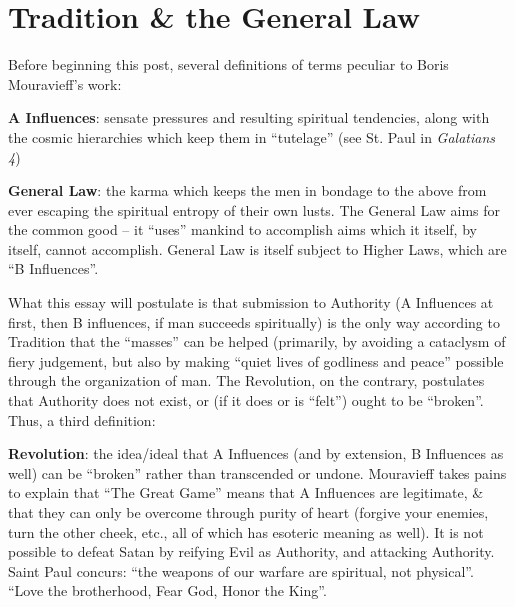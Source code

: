 \section{Tradition \& the General Law}

Before beginning this post, several definitions of terms peculiar to Boris Mouravieff's work:

\textbf{A Influences}: sensate pressures and resulting spiritual tendencies, along with the cosmic hierarchies which keep them in ``tutelage'' (see St. Paul in \emph{Galatians 4})

\textbf{General Law}: the karma which keeps the men in bondage to the above from ever escaping the spiritual entropy of their own lusts. The General Law aims for the common good -- it ``uses'' mankind to accomplish aims which it itself, by itself, cannot accomplish. General Law is itself subject to Higher Laws, which are ``B Influences''.

What this essay will postulate is that submission to Authority (A Influences at first, then B influences, if man succeeds spiritually) is the only way according to Tradition that the ``masses'' can be helped (primarily, by avoiding a cataclysm of fiery judgement, but also by making ``quiet lives of godliness and peace'' possible through the organization of man. The Revolution, on the contrary, postulates that Authority does not exist, or (if it does or is ``felt'') ought to be ``broken''. Thus, a third definition:

\textbf{Revolution}: the idea/ideal that A Influences (and by extension, B Influences as well) can be ``broken'' rather than transcended or undone. Mouravieff takes pains to explain that ``The Great Game'' means that A Influences are legitimate, \& that they can only be overcome through purity of heart (forgive your enemies, turn the other cheek, etc., all of which has esoteric meaning as well). It is not possible to defeat Satan by reifying Evil as Authority, and attacking Authority. Saint Paul concurs: ``the weapons of our warfare are spiritual, not physical''. ``Love the brotherhood, Fear God, Honor the King''.

